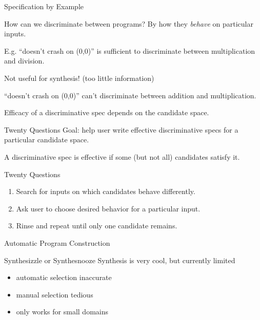 \documentclass{beamer}
\begin{document}
\begin{frame}{Specification by Example}
\begin{block}{How can we discriminate between programs?}
  By how they {\em behave} on particular inputs.

  E.g. ``doesn't crash on (0,0)'' is sufficient to discriminate
  between multiplication and division.

  Not useful for synthesis! (too little information)

  ``doesn't crash on (0,0)'' can't discriminate between addition and
  multiplication.

  Efficacy of a discriminative spec depends on the candidate space.

\end{block}
\end{frame}

\begin{frame}{Twenty Questions}
  Goal: help user write effective discriminative specs for a
  particular candidate space.

  A discriminative spec is effective if some (but not all) candidates
  satisfy it.

  \begin{block}{Twenty Questions}
  \begin{enumerate}
  \item{Search for inputs on which candidates behave differently.}
  \item{Ask user to choose desired behavior for a particular input.}
  \item{Rinse and repeat until only one candidate remains.}
  \end{enumerate}
  \end{block}
\end{frame}

\begin{frame}{Automatic Program Construction}
  \begin{block}{Synthesizzle or Synthesnooze}
    Synthesis is very cool, but currently limited

    \begin{itemize}
      \item automatic selection inaccurate
      \item manual selection tedious
      \item only works for small domains
    \end{itemize}
  \end{block}
\end{frame}








\end{document}
